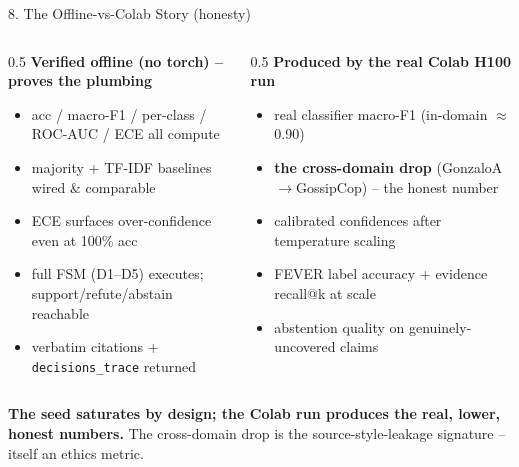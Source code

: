 \documentclass[10pt,aspectratio=169]{beamer}
\begin{document}
\begin{frame}{8. The Offline-vs-Colab Story (honesty)}
\begin{columns}[T]
\begin{column}{0.5\textwidth}
\textbf{Verified offline (no torch) -- proves the plumbing}
\begin{itemize}\small
  \item acc / macro-F1 / per-class / ROC-AUC / ECE all compute
  \item majority + TF-IDF baselines wired \& comparable
  \item ECE surfaces over-confidence even at 100\% acc
  \item full FSM (D1--D5) executes; support/refute/abstain reachable
  \item verbatim citations + \texttt{decisions\_trace} returned
\end{itemize}
\end{column}
\begin{column}{0.5\textwidth}
\textbf{Produced by the real Colab H100 run}
\begin{itemize}\small
  \item real classifier macro-F1 (in-domain $\approx$ 0.90)
  \item \textbf{the cross-domain drop} (GonzaloA$\rightarrow$GossipCop) -- the honest number
  \item calibrated confidences after temperature scaling
  \item FEVER label accuracy + evidence recall@k at scale
  \item abstention quality on genuinely-uncovered claims
\end{itemize}
\end{column}
\end{columns}

\vspace{0.2cm}
\centering
\small \textbf{The seed saturates by design; the Colab run produces the real, lower, honest numbers.} The cross-domain drop is the source-style-leakage signature -- itself an ethics metric.
\end{frame}
\end{document}

